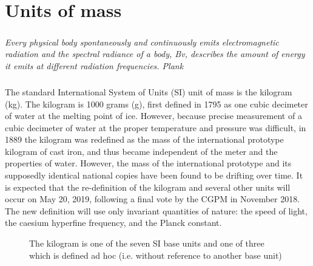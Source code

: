 \documentclass{book}
\begin{document}
    \chapter{Units of mass}
    \label{ch:Units}
    \paragraph{}
    \begin{flushright}
        \emph{Every physical body spontaneously and continuously emits electromagnetic radiation and the spectral radiance of a body, Bv, describes the amount of energy it emits at different radiation frequencies. \textemdash Plank}
    \end{flushright}
    
    \paragraph{}
    The standard International System of Units (SI) unit of mass is the kilogram (kg). The kilogram is 1000 grams (g), first defined in 1795 as one cubic decimeter of water at the melting point of ice. However, because precise measurement of a cubic decimeter of water at the proper temperature and pressure was difficult, in 1889 the kilogram was redefined as the mass of the international prototype kilogram of cast iron, and thus became independent of the meter and the properties of water. However, the mass of the international prototype and its supposedly identical national copies have been found to be drifting over time. It is expected that the re-definition of the kilogram and several other units will occur on May 20, 2019, following a final vote by the CGPM in November 2018\cite{von2017metrology}. The new definition will use only invariant quantities of nature: the speed of light, the caesium hyperfine frequency, and the Planck constant.\cite{bipm-si}
    
    \begin{figure}[h]
        \centering
        \caption[Kilogram]{The kilogram is one of the seven SI base units and one of three which is defined ad hoc (i.e. without reference to another base unit)}
    \end{figure}
    
\end{document}
